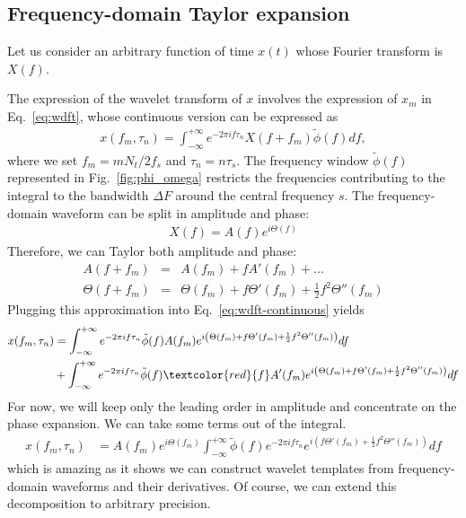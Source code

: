 \documentclass{article}
\begin{document}
\subsection{Frequency-domain Taylor expansion}

Let us consider an arbitrary function of time $x(t)$ whose Fourier transform is $X(f)$.

The expression of the wavelet transform of $x$ involves the expression of $x_m$ in Eq.~\ref{eq:wdft}, whose continuous version can be expressed as
\begin{align}
\label{eq:wdft-continuous}
    x(f_m, \tau_n) = \int_{-\infty}^{+\infty} e^{-2\pi i f \tau_n} X(f+ f_m)\tilde{\phi}(f) df,
\end{align}
where we set $f_m = m N_t/2 f_s$ and $\tau_n = n \tau_s$.
The frequency window $\tilde{\phi}(f)$ represented in Fig.~\ref{fig:phi_omega} restricts the frequencies contributing to the integral to the bandwidth $\Delta F$ around the central frequency $s$. 
The frequency-domain waveform can be split in amplitude and phase:
\begin{eqnarray}
\label{eq:amplitude_phase_split}
    X(f) = A(f) e^{i\Theta(f)}
\end{eqnarray}
Therefore, we can Taylor both amplitude and phase:
\begin{eqnarray}
    A(f + f_m) &=& A(f_m) + f A'(f_m) + ... \\
    \Theta(f + f_m) &=& \Theta(f_m) + f \Theta'(f_m) + \frac{1}{2} f^2 \Theta''(f_m)
\end{eqnarray}
Plugging this approximation into Eq.~\eqref{eq:wdft-continuous} yields
\begin{align}
\label{eq:wdft-continuous-taylor}
    x(f_m, \tau_n) & = \int_{-\infty}^{+\infty} e^{-2\pi i f \tau_n} \tilde{\phi}(f) A(f_m) e^{i \left(\Theta(f_m) + f \Theta'(f_m) + \frac{1}{2} f^2 \Theta''(f_m)\right)} df \nonumber \\
    & + \int_{-\infty}^{+\infty} e^{-2\pi i f \tau_n} \tilde{\phi}(f) \textcolor{red}{f} A'(f_m) e^{i\left(\Theta(f_m) + f \Theta'(f_m) + \frac{1}{2} f^2 \Theta''(f_m)\right)} df
\end{align}
For now, we will keep only the leading order in amplitude and concentrate on the phase expansion. We can take some terms out of the integral.
\begin{align}
\label{eq:wdft-continuous-taylor-2}
    x(f_m, \tau_n) & = A(f_m) e^{i\Theta(f_m)} \int_{-\infty}^{+\infty} \tilde{\phi}(f)  e^{-2\pi i f \tau_n} e^{i \left(f \Theta'(f_m) + \frac{1}{2} f^2 \Theta''(f_m)\right)} df 
\end{align}
which is amazing as it shows we can construct wavelet templates from frequency-domain waveforms and their derivatives. Of course, we can extend this decomposition to arbitrary precision. 
\end{document}
